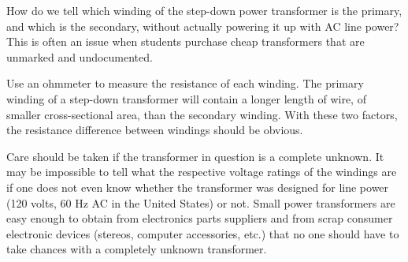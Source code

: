 

How do we tell which winding of the step-down power transformer is the primary, and which is the secondary, without actually powering it up with AC line power?  This is often an issue when students purchase cheap transformers that are unmarked and undocumented.







Use an ohmmeter to measure the resistance of each winding.  The primary winding of a step-down transformer will contain a longer length of wire, of smaller cross-sectional area, than the secondary winding.  With these two factors, the resistance difference between windings should be obvious.







Care should be taken if the transformer in question is a complete unknown.  It may be impossible to tell what the respective voltage ratings of the windings are if one does not even know whether the transformer was designed for line power (120 volts, 60 Hz AC in the United States) or not.  Small power transformers are easy enough to obtain from electronics parts suppliers and from scrap consumer electronic devices (stereos, computer accessories, etc.) that no one should have to take chances with a completely unknown transformer.



